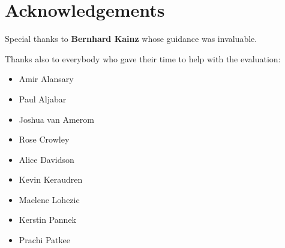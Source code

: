 \chapter*{Acknowledgements}

Special thanks to \textbf{Bernhard Kainz} whose guidance was invaluable.

Thanks also to everybody who gave their time to help with the evaluation:

\begin{itemize}
	\item Amir Alansary
	\item Paul Aljabar
	\item Joshua van Amerom
	\item Rose Crowley
	\item Alice Davidson
	\item Kevin Keraudren
	\item Maelene Lohezic
	\item Kerstin Pannek
	\item Prachi Patkee
\end{itemize}